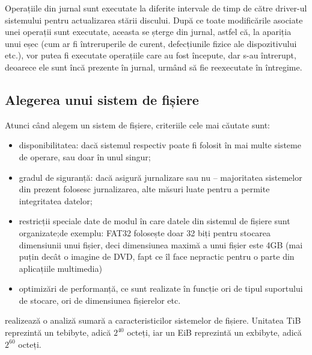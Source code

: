 Operațiile din jurnal sunt executate la diferite intervale de timp de către driver-ul sistemului pentru actualizarea stării discului.
După ce toate modificările asociate unei operații sunt executate, aceasta se șterge din jurnal, astfel că, la apariția unui eșec (cum ar fi întreruperile de curent, defecțiunile fizice ale dispozitivului etc.), vor putea fi executate operațiile care au fost începute, dar s-au întrerupt, deoarece ele sunt încă prezente în jurnal, urmând să fie reexecutate în întregime.

\subsection{Alegerea unui sistem de fișiere}
\label{sec:fs:choose}

Atunci când alegem un sistem de fișiere, criteriile cele mai căutate sunt:

\begin{itemize}
  \item disponibilitatea: dacă sistemul respectiv poate fi folosit în mai multe sisteme de operare, sau doar în unul singur;
  \item gradul de siguranță: dacă asigură jurnalizare sau nu -- majoritatea sistemelor din prezent folosesc jurnalizarea, alte măsuri luate pentru a permite integritatea datelor;
  \item restricții speciale date de modul în care datele din sistemul de fișiere sunt organizate;de exemplu: FAT32 folosește doar 32 biți pentru stocarea dimensiunii unui fișier, deci dimensiunea maximă a unui fișier este 4GB (mai puțin decât o imagine de DVD, fapt ce îl face nepractic pentru o parte din aplicațiile multimedia)
  \item optimizări de performanță, ce sunt realizate în funcție ori de tipul suportului de stocare, ori de dimensiunea fișierelor etc.
\end{itemize}

 realizează o analiză sumară a caracteristicilor sistemelor de fișiere.
Unitatea TiB reprezintă un tebibyte, adică $2^{40}$ octeți, iar un EiB reprezintă un exbibyte, adică $2^{60}$ octeți.

